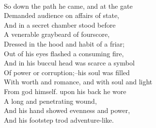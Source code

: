 \documentclass[smalldemyvopaper,11pt,twoside,onecolumn,openright,extrafontsizes]{memoir}
\begin{document}
\\So down the path he came, and at the gate
\\Demanded audience on affairs of state,
\\And in a secret chamber stood before
\\A venerable graybeard of fourscore,
\\Dressed in the hood and habit of a friar;
\\Out of his eyes flashed a consuming fire,
\\And in his buccul head was scarce a symbol
\\Of power or corruption;--his soul was filled
\\With worth and romance, and with soul and light
\\From god himself. upon his back he wore
\\A long and penetrating wound,
\\And his hand showed evenness and power,
\\And his footstep trod adventure-like.
\end{document}

